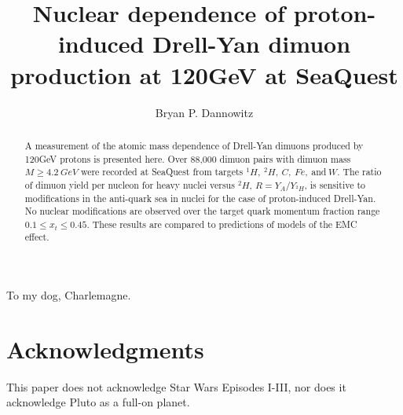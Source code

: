 \documentclass[edeposit,fullpage]{uiucthesis2009}
\begin{document}
\title{Nuclear dependence of proton-induced Drell-Yan dimuon production at 120GeV at SeaQuest}
\author{Bryan P. Dannowitz}
\phdthesis
{}
\maketitle

\frontmatter

\begin{abstract}
A measurement of the atomic mass dependence of Drell-Yan dimuons produced by 120GeV protons
is presented here. Over 88,000 dimuon pairs with dimuon mass $M \geq 4.2\ GeV$ were recorded at 
SeaQuest from targets $^1H,\ ^2H,\ C,\ Fe,\ $and$\ W$. The ratio of dimuon yield per nucleon for 
heavy nuclei versus $^2H$, $R = Y_A / Y_{^2H}$, is sensitive to modifications in the anti-quark
sea in nuclei for the case of proton-induced Drell-Yan. No nuclear modifications are observed
over the target quark momentum fraction range $0.1 \leq x_t \leq 0.45$. These results are
compared to predictions of models of the EMC effect.
\end{abstract}

\begin{dedication}
To my dog, Charlemagne.
\end{dedication}

\chapter*{Acknowledgments}

This paper does not acknowledge Star Wars Episodes I-III, nor does it acknowledge Pluto as a full-on planet.

\end{document}
